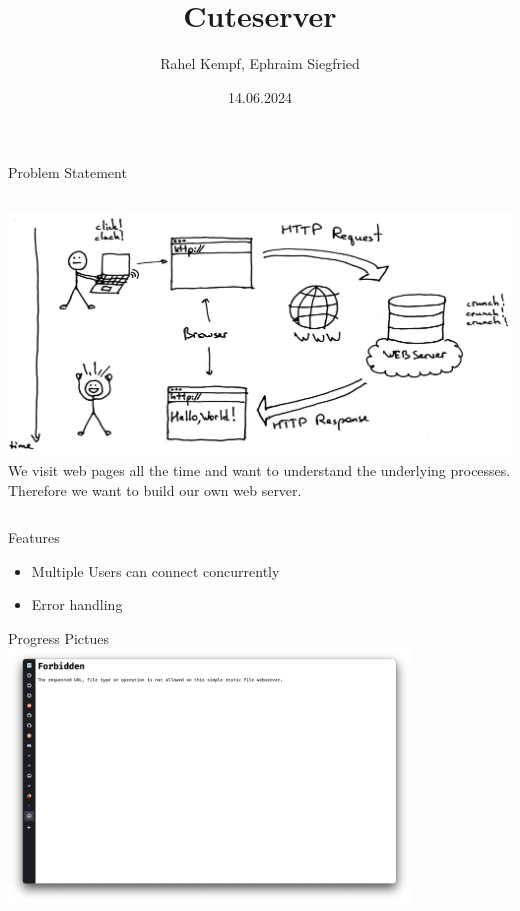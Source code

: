 \documentclass[aspectratio=169]{beamer}
\title              {Cuteserver}
\author             {Rahel Kempf, Ephraim Siegfried}
\institute          {Operating Systems, University of Basel}
\date               {14.06.2024}
\begin{document}
\begin{frame}[t,plain]
\titlepage
\end{frame}

\begin{frame}[c]{Problem Statement}
\begin{columns}[c]
        \includegraphics[width=\textwidth,height=\textheight,keepaspectratio]{webserver-comic.jpg}
   We visit web pages all the time and want to understand the underlying processes. Therefore we want to build our own web server.
\end{columns}
\end{frame}

\begin{frame}[c]{Features}
   \begin{itemize}
       \item Multiple Users can connect concurrently 
       \item Error handling 
   \end{itemize} 
\end{frame}

\begin{frame}[c]{Progress Pictues}
  \centering
  \includegraphics[width=0.8\textwidth,height=\textheight,keepaspectratio]{00_errors.png}
\end{frame}
\end{document}

